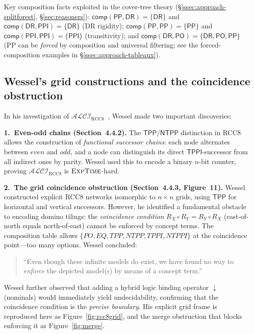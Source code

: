 \documentclass[11pt]{article}
\newcommand{\ALCIRCC}[1]{\mathcal{ALCI}_{\mathrm{RCC#1}}}
\newcommand{\DR}{\mathsf{DR}}
\newcommand{\PO}{\mathsf{PO}}
\newcommand{\PP}{\mathsf{PP}}
\newcommand{\PPI}{\mathsf{PPI}}
\newcommand{\EXPTIME}{\textsc{ExpTime}}
\newcommand{\TPP}{\ensuremath{\mathsf{TPP}}}
\newcommand{\NTPP}{\ensuremath{\mathsf{NTPP}}}
\newcommand{\TPPI}{\ensuremath{\mathsf{TPPI}}}
\newcommand{\comp}{\ensuremath{\mathsf{comp}}}
\theoremstyle{plain}
\theoremstyle{definition}
\begin{document}
\noindent
Key composition facts exploited in the cover-tree theory
(\S\ref{ssec:approach-splitforest}, \S\ref{sec:reasoners}):
$\comp(\PP,\DR) = \{\DR\}$ and $\comp(\DR,\PPI) = \{\DR\}$
(DR rigidity);
$\comp(\PP,\PP) = \{\PP\}$ and $\comp(\PPI,\PPI) = \{\PPI\}$
(transitivity);
and $\comp(\DR,\PO) = \{\DR,\PO,\PP\}$
(PP can be \emph{forced} by composition and universal filtering;
see the forced-composition examples in \S\ref{ssec:approach-tableaux}).

\subsection{Wessel's grid constructions and the coincidence obstruction}
\label{sec:wessel-grid}

In his investigation of $\ALCIRCC{8}$~\cite{Wessel2003}, Wessel
made two important discoveries:

\medskip\noindent\textbf{1.\ Even-odd chains (Section~4.4.2).}
The $\TPP/\NTPP$ distinction in RCC8 allows the construction of
\emph{functional successor chains}: each node alternates between
$\mathit{even}$ and $\mathit{odd}$, and a node can distinguish its
direct $\TPPI$-successor from all indirect ones by parity.
Wessel used this to encode a binary $n$-bit counter, proving
$\ALCIRCC{8}$ is $\EXPTIME$-hard.

\medskip\noindent\textbf{2.\ The grid coincidence obstruction (Section~4.4.3,
Figure~11).}
Wessel constructed explicit RCC8 networks isomorphic to
$n \times n$ grids, using $\TPP$ for horizontal and vertical
successors.  However, he identified a fundamental obstacle to
encoding domino tilings: the \emph{coincidence condition}
$R_X \circ R_Y = R_Y \circ R_X$ (east-of-north equals
north-of-east) cannot be enforced by concept terms.
The composition table allows $\{PO, EQ, TPP, NTPP, TPPI, NTPPI\}$
at the coincidence point---too many options.  Wessel concluded:
\begin{quote}
``Even though these infinite models do exist, we have found no way
to \emph{enforce} the depicted model(s) by means of a concept term.''
\end{quote}
Wessel further observed that adding a hybrid logic binding operator
$\downarrow$ (nominals) would immediately yield undecidability,
confirming that the coincidence condition is the \emph{precise
boundary}.  His explicit grid frame is reproduced here as
Figure~\ref{fig:rcc8grid}, and the merge obstruction that blocks enforcing
it as Figure~\ref{fig:merge}.
\end{document}
